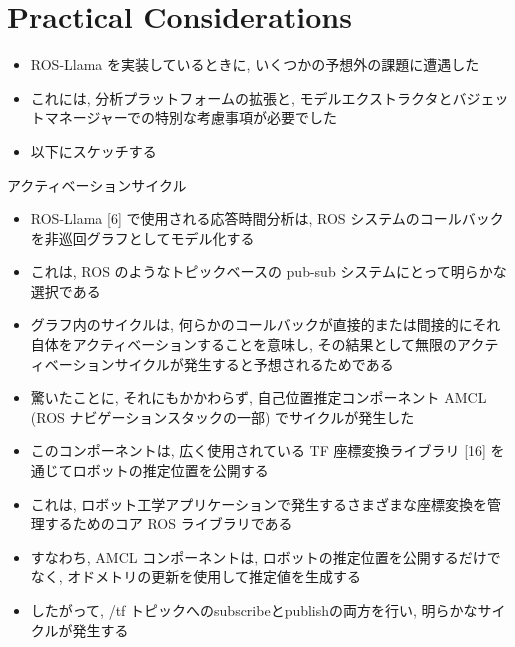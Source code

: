 
\section{Practical Considerations}
\label{sec: practical considerations}

\begin{frame}{}
    \begin{itemize}
        \item ROS-Llama を実装しているときに, いくつかの予想外の課題に遭遇した
\item これには, 分析プラットフォームの拡張と, モデルエクストラクタとバジェットマネージャーでの特別な考慮事項が必要でした
\item 以下にスケッチする
    \end{itemize}
\end{frame}

\begin{frame}{アクティベーションサイクル}
    \begin{itemize}
        \item ROS-Llama [6] で使用される応答時間分析は, ROS システムのコールバックを非巡回グラフとしてモデル化する
\item これは, ROS のようなトピックベースの pub-sub システムにとって明らかな選択である
\item グラフ内のサイクルは, 何らかのコールバックが直接的または間接的にそれ自体をアクティベーションすることを意味し, その結果として無限のアクティベーションサイクルが発生すると予想されるためである
    \end{itemize}
\end{frame}

\begin{frame}{}
    \begin{itemize}
        \item 驚いたことに, それにもかかわらず, 自己位置推定コンポーネント AMCL (ROS ナビゲーションスタックの一部) でサイクルが発生した
\item このコンポーネントは, 広く使用されている TF 座標変換ライブラリ [16] を通じてロボットの推定位置を公開する
\item これは, ロボット工学アプリケーションで発生するさまざまな座標変換を管理するためのコア ROS ライブラリである
\item すなわち, AMCL コンポーネントは, ロボットの推定位置を公開するだけでなく, オドメトリの更新を使用して推定値を生成する
\item したがって, /tf トピックへのsubscribeとpublishの両方を行い, 明らかなサイクルが発生する
    \end{itemize}
\end{frame}

